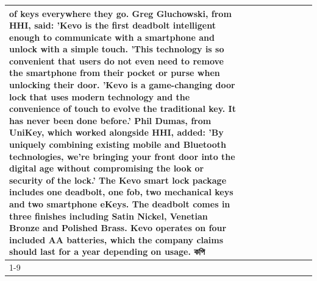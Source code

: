 \begin{table}[H]
\begin{tabular}{lllrlllll}
of keys everywhere they go. Greg Gluchowski, from HHI, said: 'Kevo is the first deadbolt intelligent enough to communicate with a smartphone and unlock with a simple touch. 'This technology is so convenient that users do not even need to remove the smartphone from their pocket or purse when unlocking their door. 'Kevo is a game-changing door lock that uses modern technology and the convenience of touch to evolve the traditional key. It has never been done before.' Phil Dumas, from UniKey, which worked alongside HHI, added: 'By uniquely combining existing mobile and Bluetooth technologies, we’re bringing your front door into the digital age without compromising the look or security of the lock.' The Kevo smart lock package includes one deadbolt, one fob, two mechanical keys and two smartphone eKeys. The deadbolt comes in three finishes including Satin Nickel, Venetian Bronze and Polished Brass. Kevo operates on four included AA batteries, which the company claims should last for a year depending on usage. কপি \\
\cline{1-9}

\end{tabular}
\end{table}
